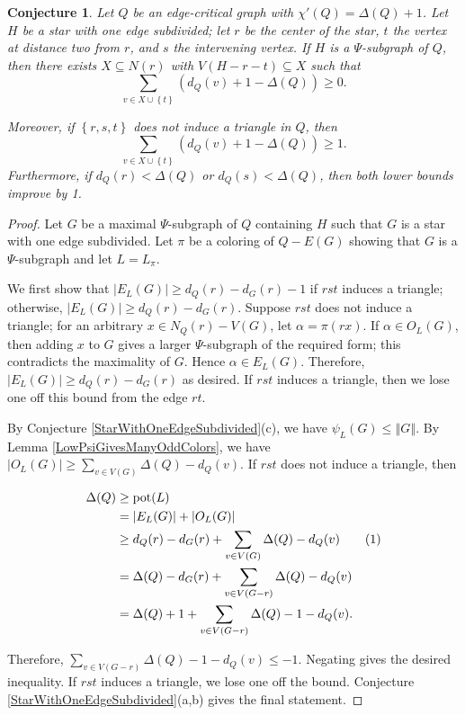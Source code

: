 \documentclass[12pt]{article}
\theoremstyle{plain}
\newtheorem{conjecture}[thm]{Conjecture}
\theoremstyle{definition}
\theoremstyle{remark}
\newcommand{\set}[1]{\left\{ #1 \right\}}
\newcommand{\card}[1]{\left|#1\right|}
\newcommand{\size}[1]{\left\Vert#1\right\Vert}
\newcommand{\pot}{\operatorname{pot}}
\newcommand\numberthis{\addtocounter{equation}{1}\tag{\theequation}}
\begin{document}
\begin{conjecture}\label{AdjacencyPrecursor}
Let $Q$ be an edge-critical graph with $\chi'(Q) = \Delta(Q) + 1$.  
Let $H$ be a star with one edge subdivided; let $r$ be the center of the star,
$t$ the vertex at distance two from $r$, and $s$ the intervening vertex. 
If $H$ is a $\Psi$-subgraph of $Q$, 
then there exists $X \subseteq N(r)$ with $V(H - r - t)
\subseteq X$ such that \[\sum_{v \in X \cup \set{t}} (d_Q(v) + 1 - \Delta(Q))
\ge 0.\]  
	
\noindent Moreover, if $\set{r,s,t}$ does not induce a triangle in $Q$, then 
\[\sum_{v \in X \cup \set{t}} (d_Q(v) + 1 - \Delta(Q)) \ge 1.\]
Furthermore, if $d_Q(r)<\Delta(Q)$ or $d_Q(s)<\Delta(Q)$, then both lower
bounds improve by 1.
\end{conjecture}
\begin{proof}
Let $G$ be a maximal $\Psi$-subgraph of $Q$ containing $H$ such that $G$
is a star with one edge subdivided.  Let $\pi$ be a coloring of $Q - E(G)$
showing that $G$ is a $\Psi$-subgraph and let $L = L_\pi$.  
	
We first show that $\card{E_{L}(G)} \ge d_Q(r) - d_G(r) - 1$ if $rst$ induces a
triangle; otherwise, $\card{E_{L}(G)} \ge d_Q(r) - d_G(r)$.
Suppose $rst$ does not induce a triangle; for an arbitrary $x \in N_Q(r) - V(G)$,
let $\alpha=\pi(rx)$.  If $\alpha \in O_{L}(G)$, then adding $x$ to $G$ gives a
larger $\Psi$-subgraph of the required form; this contradicts the maximality of
$G$.  Hence $\alpha \in E_{L}(G)$.  Therefore, $\card{E_{L}(G)} \ge d_Q(r) -
d_G(r)$ as desired.  If $rst$ induces a triangle, then we lose one off this
bound from the edge $rt$.
	
By Conjecture \ref{StarWithOneEdgeSubdivided}(c), we have $\psi_L(G) \le
\size{G}$.  By Lemma \ref{LowPsiGivesManyOddColors}, we have
$\card{O_{L}(G)} \ge \sum_{v \in V(G)} \Delta(Q) - d_Q(v)$.  If $rst$ does
not induce a triangle, then
	
\begin{align*}
\Delta(Q) &\ge \pot(L)\\
&= \card{E_{L}(G)} + \card{O_{L}(G)}\\
&\ge d_Q(r) - d_G(r) + \sum_{v \in V(G)} \Delta(Q) - d_Q(v) \numberthis
\label{strict-ineq}\\
&= \Delta(Q) - d_G(r) + \sum_{v \in V(G - r)} \Delta(Q) - d_Q(v)\\
&= \Delta(Q) + 1 +\sum_{v \in V(G - r)} \Delta(Q) - 1 - d_Q(v).
\end{align*}
	
Therefore, $\sum_{v \in V(G - r)} \Delta(Q) - 1 - d_Q(v) \le -1$.  Negating
gives the desired inequality.  If $rst$ induces a triangle, we lose one off the
bound.  Conjecture \ref{StarWithOneEdgeSubdivided}(a,b) gives the final statement.
\end{proof}
\end{document}
